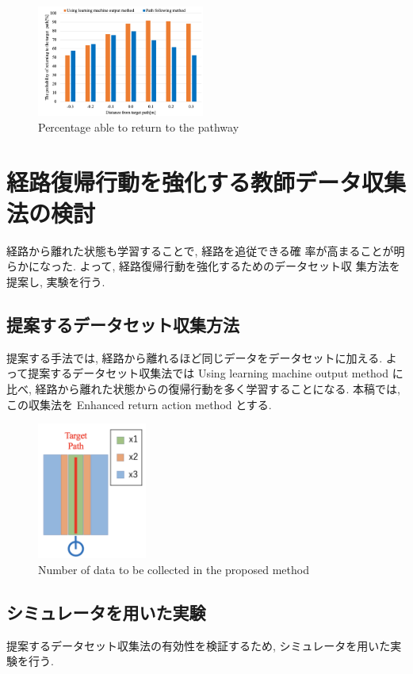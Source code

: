 \documentclass{jarticle}
\begin{document}
\begin{figure}[h!]
  \centering
   \includegraphics[height=36.6mm]{./figs/path.png}
   \caption{Percentage able to return to the pathway}
\end{figure}



\section{経路復帰行動を強化する教師データ収集法の検討}

経路から離れた状態も学習することで, 経路を追従できる確
率が高まることが明らかになった. よって, 経路復帰行動を強化するためのデータセット収
集方法を提案し, 実験を行う.

\subsection{提案するデータセット収集方法}
提案する手法では, 経路から離れるほど同じデータをデータセットに加える.
よって提案するデータセット収集法では Using learning machine output method に比べ, 
経路から離れた状態からの復帰行動を多く学習することになる.
本稿では, この収集法を Enhanced return action method とする.

\begin{figure}[h!]\vspace*{-3mm}
  \centering
   \includegraphics[height=45mm]{./figs/method.png}
   \caption{Number of data to be collected in the proposed method}
\end{figure}


\subsection{シミュレータを用いた実験}
提案するデータセット収集法の有効性を検証するため, シミュレータを用いた実験を行う.
\end{document}
